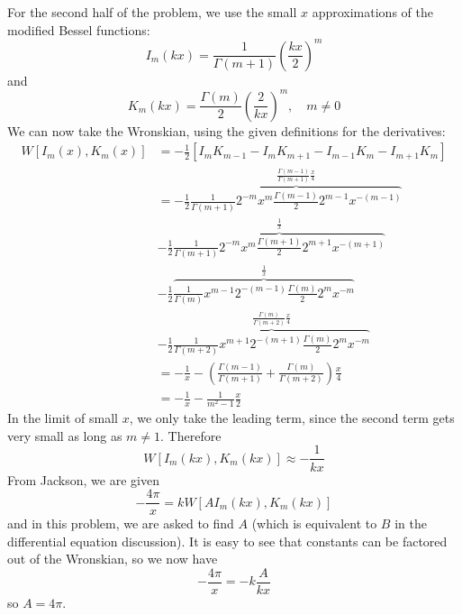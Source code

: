 \documentclass[a4paper,twoside]{article}
\begin{document}
\begin{tcolorbox}[breakable]
    For the second half of the problem, we use the small $ x $ approximations of the modified Bessel functions:
    \begin{equation}
        I_m(kx) = \frac{1}{\Gamma (m+1)} \left( \frac{kx}{2} \right)^m
    \end{equation}
    and
    \begin{equation}
        K_m(kx) = \frac{\Gamma (m)}{2} \left( \frac{2}{kx} \right)^m,\quad m \neq 0
    \end{equation}
    We can now take the Wronskian, using the given definitions for the derivatives:
    \begin{align}
        W[I_m(x),K_m(x)] &= - \frac{1}{2} \left[ I_m K_{m-1} - I_m K_{m+1} - I_{m-1}K_m - I_{m+1}K_m \right]\\
        &= -\frac{1}{2}\overbrace{\frac{1}{\Gamma (m+1)} 2^{-m} x^m \frac{\Gamma (m-1)}{2} 2^{m-1} x^{-(m-1)}}^{\frac{\Gamma (m-1)}{\Gamma (m+1)} \frac{x}{4}}\\ &-\frac{1}{2}\overbrace{\frac{1}{\Gamma (m+1)} 2^{-m} x^m \frac{\Gamma (m+1)}{2} 2^{m+1} x^{-(m+1)}}^{\frac{1}{x}}\\ &-\frac{1}{2}\overbrace{\frac{1}{\Gamma (m)} x^{m-1} 2^{-(m-1)} \frac{\Gamma (m)}{2} 2^m x^{-m}}^{\frac{1}{x}}\\ &-\frac{1}{2}\overbrace{\frac{1}{\Gamma (m+2)} x^{m+1} 2^{-(m+1)} \frac{\Gamma (m)}{2} 2^m x^{-m}}^{\frac{\Gamma (m)}{\Gamma (m+2)} \frac{x}{4}}\\
        &= - \frac{1}{x} - \left( \frac{\Gamma (m-1)}{\Gamma (m+1)} + \frac{\Gamma (m)}{\Gamma (m+2)} \right) \frac{x}{4}\\
        &= - \frac{1}{x} - \frac{1}{m^2 - 1} \frac{x}{2}
    \end{align}
    In the limit of small $ x $, we only take the leading term, since the second term gets very small as long as $ m \neq 1 $. Therefore
    \begin{equation}
        W[I_m(kx),K_m(kx)]\approx - \frac{1}{kx}
    \end{equation}
    From Jackson, we are given
    \begin{equation}
        - \frac{4 \pi}{x} = k W[A I_m(kx), K_m(kx)]
    \end{equation}
    and in this problem, we are asked to find $ A $ (which is equivalent to $ B $ in the differential equation discussion). It is easy to see that constants can be factored out of the Wronskian, so we now have
    \begin{equation}
        - \frac{4 \pi}{x} =- k \frac{A}{kx}
    \end{equation}
    so $ A = 4 \pi $.
\end{tcolorbox}
\end{document}
